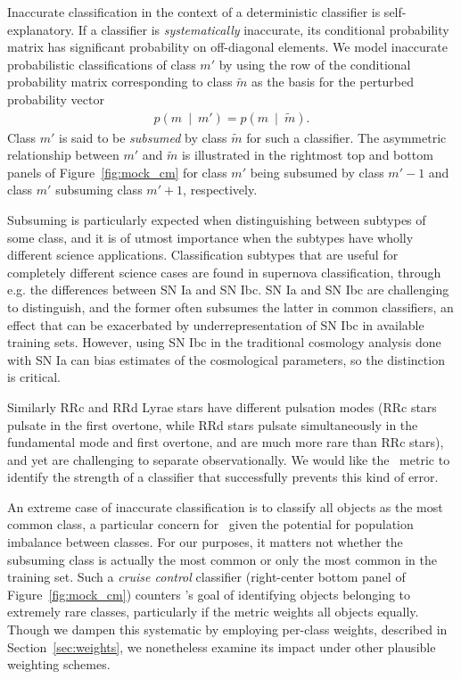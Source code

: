 Inaccurate classification in the context of a deterministic classifier is self-explanatory.
If a classifier is \textit{systematically} inaccurate, its conditional probability matrix has significant probability on off-diagonal elements.
We model inaccurate probabilistic classifications of class $m'$ by using the row of the conditional probability matrix corresponding to class $\tilde{m}$ as the basis for the perturbed probability vector
\begin{eqnarray}
  \label{eq:subsume}
  p(m\ \mid\ m') = p(m\ \mid\ \tilde{m}).
\end{eqnarray}
Class $m'$ is said to be \textit{subsumed} by class $\tilde{m}$ for such a classifier.
The asymmetric relationship between $m'$ and $\tilde{m}$ is illustrated in the rightmost top and bottom panels of Figure~\ref{fig:mock_cm} for class $m'$ being subsumed by class $m'-1$ and class $m'$ subsuming class $m'+1$, respectively.

Subsuming is particularly expected when distinguishing between subtypes of some class, and it is of utmost importance when the subtypes have wholly different science applications.
Classification subtypes that are useful for completely different science cases are found in supernova classification, through e.g. the differences between SN Ia and SN Ibc. SN Ia and SN Ibc are challenging to distinguish, and the former often subsumes the latter in common classifiers, an effect that can be exacerbated by underrepresentation of SN Ibc in available training sets.
However, using SN Ibc in the traditional cosmology analysis done with SN Ia can bias estimates of the cosmological parameters, so the distinction is critical.

Similarly RRc and RRd Lyrae stars have different pulsation modes (RRc stars pulsate in the first overtone, while RRd stars pulsate simultaneously in the fundamental mode and first overtone, and are much more rare than RRc stars), and yet are challenging to separate observationally. We would like the \plasticc\ metric to identify the strength of a classifier that successfully prevents this kind of error.

An extreme case of inaccurate classification is to classify all objects as the most common class, a particular concern for \plasticc\ given the potential for population imbalance between classes.
For our purposes, it matters not whether the subsuming class is actually the most common or only the most common in the training set.
Such a \textit{cruise control} classifier (right-center bottom panel of Figure~\ref{fig:mock_cm}) counters \plasticc's goal of identifying objects belonging to extremely rare classes, particularly if the metric weights all objects equally.
Though we dampen this systematic by employing per-class weights, described in Section~\ref{sec:weights}, we nonetheless examine its impact under other plausible weighting schemes.

